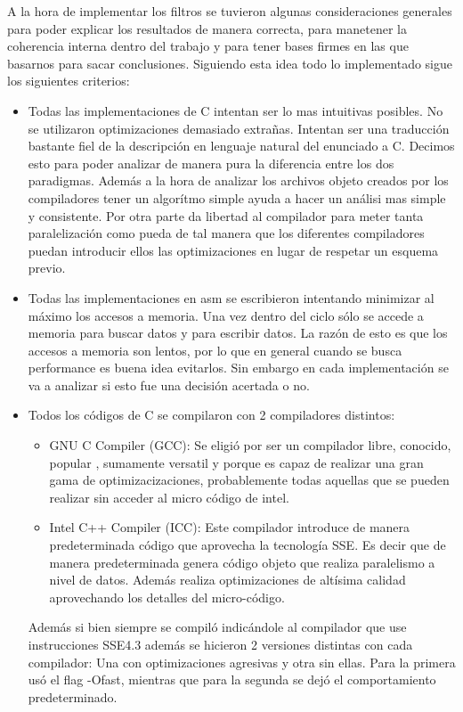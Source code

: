 	A la hora de implementar los filtros se tuvieron algunas consideraciones generales 
para poder explicar los resultados de manera correcta, para manetener la coherencia
interna dentro del trabajo y para tener bases firmes en las que basarnos para sacar
conclusiones.
	Siguiendo esta idea todo lo implementado sigue los siguientes criterios:
		\begin{itemize}
			\item Todas las implementaciones de C intentan ser lo mas intuitivas posibles. No se
			utilizaron optimizaciones demasiado extrañas. Intentan ser una traducción bastante
			fiel de la descripción en lenguaje natural del enunciado a C. Decimos esto para
			poder analizar de manera pura la diferencia entre los dos paradigmas. Además
			a la hora de analizar los archivos objeto creados por los compiladores
			tener un algorítmo simple ayuda a hacer un análisi mas simple y consistente.
			Por otra parte da libertad al compilador para meter tanta paralelización como pueda
			de tal manera que los diferentes compiladores puedan introducir ellos las optimizaciones
			en lugar de respetar un esquema previo.

			\item Todas las implementaciones en asm se escribieron intentando minimizar al máximo
			los accesos a memoria. Una vez dentro del ciclo sólo se accede a memoria para buscar
			datos y para escribir datos. La razón de esto es que los accesos a memoria son lentos,
			por lo que en general cuando se busca performance es buena idea evitarlos. Sin embargo
			en cada implementación se va a analizar si esto fue una decisión acertada o no.
			
			\item Todos los códigos de C se compilaron con 2 compiladores distintos:
				\begin{itemize}
					\item GNU C Compiler (GCC): Se eligió por ser un compilador libre, conocido, popular
					, sumamente versatil y porque es capaz de realizar una gran gama de optimizacizaciones, probablemente
					todas aquellas que se pueden realizar sin acceder al micro código de intel.

					\item Intel C++ Compiler (ICC): Este compilador introduce de manera predeterminada código
					que aprovecha la tecnología SSE. Es decir que de manera predeterminada genera código objeto
					que realiza paralelismo a nivel de datos. Además realiza optimizaciones de altísima calidad
					aprovechando los detalles del micro-código.

				\end{itemize} 
				
			Además si bien siempre se compiló indicándole al compilador que use instrucciones SSE4.3 además
			se hicieron 2 versiones distintas con cada compilador: Una con optimizaciones agresivas y otra sin
			ellas. Para la primera usó el flag -Ofast, mientras que para la segunda se dejó el comportamiento
			predeterminado.

		\end{itemize}


